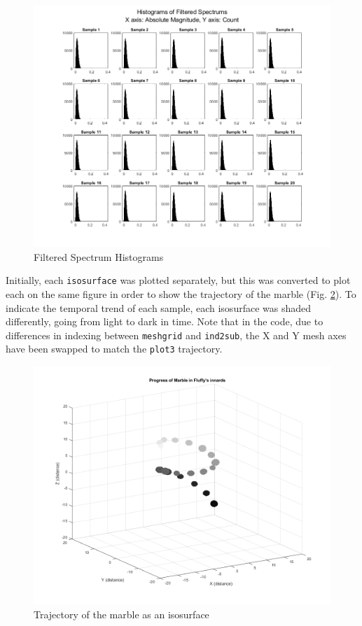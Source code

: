 \documentclass[journal]{IEEEtran}
\def\code#1{\texttt{#1}}
\begin{document}
\begin{figure}
	\centerline{\includegraphics[width=\columnwidth]{filtered_spectrum_hists.png}}
	\caption{Filtered Spectrum Histograms}\label{filt_hists}
\end{figure}


Initially, each \code{isosurface} was plotted separately, but this was converted to plot each on the same figure in order to show the trajectory of the marble (Fig. \ref{traj_iso}). To indicate the temporal trend of each sample, each isosurface was shaded differently, going from light to dark in time. Note that in the code, due to differences in indexing between \code{meshgrid} and \code{ind2sub}, the X and Y mesh axes have been swapped to match the \code{plot3} trajectory.

\begin{figure}
	\centerline{\includegraphics[width=\columnwidth]{trajectory_isosurface.png}}
	\caption{Trajectory of the marble as an isosurface}\label{traj_iso}
\end{figure}
\end{document}
